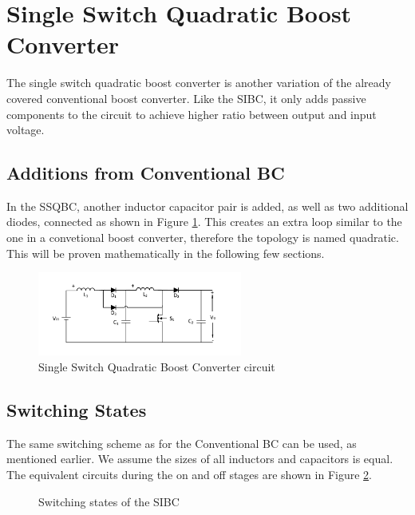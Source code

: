\section{Single Switch Quadratic Boost Converter}\label{ch:SSQBC}

The single switch quadratic boost converter is another variation of the already covered conventional boost converter. Like the SIBC, it only adds passive components to the circuit to achieve higher ratio between output and input voltage. \cite{Zhang2012}

\subsection{Additions from Conventional BC}
In the SSQBC,
another inductor capacitor pair is added, as well as two additional diodes, connected as shown in Figure \ref{fig:SSQBC}. This creates an extra loop similar to the one in a convetional boost converter, therefore the topology is named quadratic. This will be proven mathematically in the following few sections.

\begin{figure} [H]
   \centering
   \includegraphics[width=0.6\textwidth]{figures/cSingleSwitchQuadraticBC/Quadratic_boost.pdf}
    \caption{Single Switch Quadratic Boost Converter circuit}
	\label{fig:SSQBC}
\end{figure}
\subsection{Switching States}
The same switching scheme as for the Conventional BC can be used,
as mentioned earlier. We assume the sizes of all inductors and capacitors is equal.
The equivalent circuits during the on and off stages are shown in Figure \ref{fig:SSQBC_States}.

\begin{figure}[H]%
    \centering
    \qquad
    \caption{Switching states of the SIBC}%
     \label{fig:SSQBC_States}%
\end{figure}

